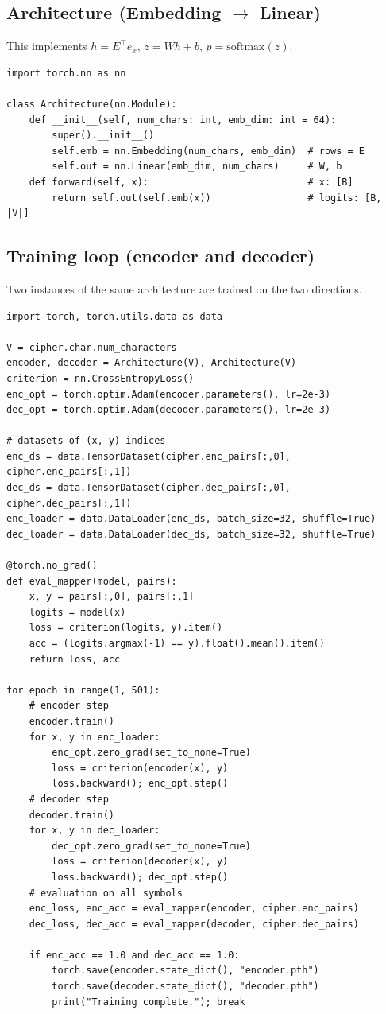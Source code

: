 \documentclass[12pt]{article}
\begin{document}
\subsection{Architecture (Embedding $\to$ Linear)}
This implements $h=E^\top e_x$, $z=Wh+b$, $p=\mathrm{softmax}(z)$.
\begin{verbatim}
import torch.nn as nn

class Architecture(nn.Module):
    def __init__(self, num_chars: int, emb_dim: int = 64):
        super().__init__()
        self.emb = nn.Embedding(num_chars, emb_dim)  # rows = E
        self.out = nn.Linear(emb_dim, num_chars)     # W, b
    def forward(self, x):                            # x: [B]
        return self.out(self.emb(x))                 # logits: [B, |V|]
\end{verbatim}

\subsection{Training loop (encoder and decoder)}
Two instances of the same architecture are trained on the two directions.
\begin{verbatim}
import torch, torch.utils.data as data

V = cipher.char.num_characters
encoder, decoder = Architecture(V), Architecture(V)
criterion = nn.CrossEntropyLoss()
enc_opt = torch.optim.Adam(encoder.parameters(), lr=2e-3)
dec_opt = torch.optim.Adam(decoder.parameters(), lr=2e-3)

# datasets of (x, y) indices
enc_ds = data.TensorDataset(cipher.enc_pairs[:,0], cipher.enc_pairs[:,1])
dec_ds = data.TensorDataset(cipher.dec_pairs[:,0], cipher.dec_pairs[:,1])
enc_loader = data.DataLoader(enc_ds, batch_size=32, shuffle=True)
dec_loader = data.DataLoader(dec_ds, batch_size=32, shuffle=True)

@torch.no_grad()
def eval_mapper(model, pairs):
    x, y = pairs[:,0], pairs[:,1]
    logits = model(x)
    loss = criterion(logits, y).item()
    acc = (logits.argmax(-1) == y).float().mean().item()
    return loss, acc

for epoch in range(1, 501):
    # encoder step
    encoder.train()
    for x, y in enc_loader:
        enc_opt.zero_grad(set_to_none=True)
        loss = criterion(encoder(x), y)
        loss.backward(); enc_opt.step()
    # decoder step
    decoder.train()
    for x, y in dec_loader:
        dec_opt.zero_grad(set_to_none=True)
        loss = criterion(decoder(x), y)
        loss.backward(); dec_opt.step()
    # evaluation on all symbols
    enc_loss, enc_acc = eval_mapper(encoder, cipher.enc_pairs)
    dec_loss, dec_acc = eval_mapper(decoder, cipher.dec_pairs)

    if enc_acc == 1.0 and dec_acc == 1.0:
        torch.save(encoder.state_dict(), "encoder.pth")
        torch.save(decoder.state_dict(), "decoder.pth")
        print("Training complete."); break
\end{verbatim}
\end{document}
